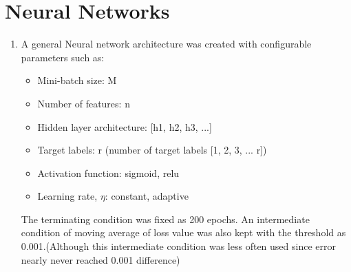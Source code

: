 \begin{enumerate}[label=(\alph*)]
\end{enumerate}

\clearpage

\section{Neural Networks}

\begin{enumerate}[label=(\alph*)]
    \item A general Neural network architecture was created with configurable parameters such as:
    \begin{itemize}
        \item Mini-batch size: M
        \item Number of features: n
        \item Hidden layer architecture: [h1, h2, h3, ...]
        \item Target labels: r (number of target labels [1, 2, 3, ... r])
        \item Activation function: sigmoid, relu
        \item Learning rate, $\eta$: constant, adaptive
    \end{itemize}
    The terminating condition was fixed as 200 epochs. An intermediate condition of moving average of loss value was also kept with the
    threshold as 0.001.(Although this intermediate condition was less often used since error nearly never reached 0.001 difference)


\end{enumerate}
